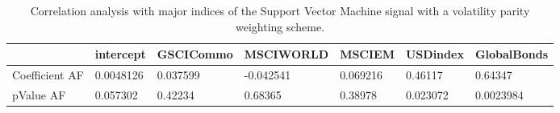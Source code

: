 \begin{table}[H]
\centering
\begin{tabular}{lllllll}
\hline& intercept & GSCICommo & MSCIWORLD & MSCIEM & USDindex & GlobalBonds \\ 
\hline 
Coefficient AF & 0.0048126 & 0.037599 & -0.042541 & 0.069216 & 0.46117 & 0.64347 \\ 
pValue AF & 0.057302 & 0.42234 & 0.68365 & 0.38978 & 0.023072 & 0.0023984 \\ 
\hline
\end{tabular}
\caption{Correlation analysis with major indices of the Support Vector Machine signal with a volatility parity weighting scheme.}
\label{SVM_MODEL_AFACTOR}
\end{table}